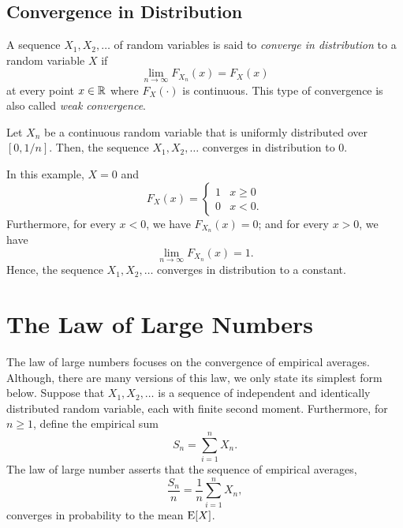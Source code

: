 \subsection{Convergence in Distribution}

A sequence $X_1, X_2, \ldots$ of random variables is said to \emph{converge in distribution} to a random variable $X$ if 
\begin{equation*}
\lim_{n \rightarrow \infty} F_{X_n} (x) = F_X (x)
\end{equation*}
at every point $x \in \mathbb{R}$ where $F_X (\cdot)$ is continuous.
This type of convergence is also called \emph{weak convergence}.  

\begin{example}
Let $X_n$ be a continuous random variable that is uniformly distributed over $[0, 1/n]$.
Then, the sequence $X_1, X_2, \ldots$ converges in distribution to $0$.

In this example, $X = 0$ and
\begin{equation*}
F_X (x) = \begin{cases} 1 & x \geq 0 \\
0 & x < 0. \end{cases}
\end{equation*}
Furthermore, for every $x < 0$, we have $F_{X_n} (x) = 0$; and for every $x > 0$, we have
\begin{equation*}
\lim_{n \rightarrow \infty} F_{X_n} (x) = 1.
\end{equation*}
Hence, the sequence $X_1, X_2, \ldots$ converges in distribution to a constant.
\end{example}


\section{The Law of Large Numbers}

The law of large numbers focuses on the convergence of empirical averages.
Although, there are many versions of this law, we only state its simplest form below.
Suppose that $X_1, X_2, \ldots$ is a sequence of independent and identically distributed random variable, each with finite second moment.
Furthermore, for $n \geq 1$, define the empirical sum
\begin{equation*}
S_n = \sum_{i=1}^n X_n .
\end{equation*}
The law of large number asserts that the sequence of empirical averages,
\begin{equation*}
\frac{S_n}{n} = \frac{1}{n} \sum_{i=1}^n X_n ,
\end{equation*}
converges in probability to the mean $\mathrm{E} [X]$.

